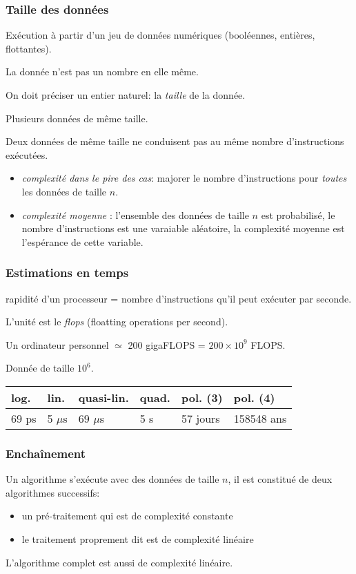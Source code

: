 \begin{frame}
  \frametitle{Taille des données}
Exécution à partir d'un jeu de données numériques (booléennes, entières, flottantes).

La donnée n'est pas un nombre en elle même.

On doit préciser un entier naturel: la \emph{taille} de la donnée.

Plusieurs données de même taille.

Deux données de même taille ne conduisent pas au même nombre d'instructions exécutées.
\begin{itemize}
  \item \emph{complexité dans le pire des cas}: majorer le nombre d'instructions pour \emph{toutes} les données de taille $n$.
  \item \emph{complexité moyenne} : l'ensemble des données de taille $n$ est probabilisé, le nombre d'instructions est une varaiable aléatoire, la complexité moyenne est l'espérance de cette variable.
\end{itemize}
\end{frame}

\begin{frame}
  \frametitle{Estimations en temps}
rapidité d'un processeur = nombre d'instructions qu'il peut exécuter par seconde.

L'unité est le \emph{flops} (floatting operations per second).

Un ordinateur personnel $\simeq$ 200 gigaFLOPS = $200\times 10^{9}$ FLOPS.

Donnée de taille $10^{6}$.
\begin{center}
\renewcommand{\arraystretch}{1.5}
\begin{tabular}{|l|l|l|l|l|l|} \hline
log. & lin. & quasi-lin. & quad. & pol. (3) & pol. (4)\\ \hline
69 ps & 5 $\mu$s & 69 $\mu$s & 5 s & 57 jours & 158548 ans \\ \hline
\end{tabular}
\end{center}
\end{frame}

\begin{frame}
  \frametitle{Enchaînement}
Un algorithme s'exécute avec des données de taille $n$, il est constitué de deux algorithmes successifs:
\begin{itemize}
  \item un pré-traitement qui est de complexité constante
  \item le traitement proprement dit est de complexité linéaire  
\end{itemize}
L'algorithme complet est aussi de complexité linéaire.
\end{frame}

